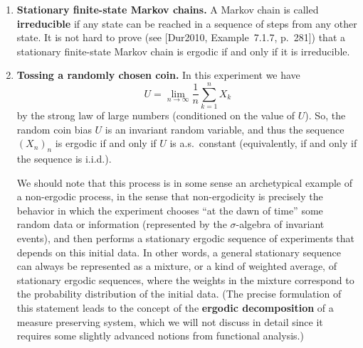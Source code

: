 \documentclass[12pt]{article}
\newcommand{\R}{\mathbb{R}}
\newcommand{\N}{\mathbb{N}}
\theoremstyle{example}
\begin{document}
\begin{enumerate}[1.]
\begin{proof}
Let $A$ be an invariant event for the $(Y_n)$ sequence. We can think of $A$ as ``living'' in the original product space $\R^\N$ associated with the shift map for the sequence $(X_n)_n$. (Formally, the sequence $(Y_n)_n$ is an infinite-dimensional random vector, i.e., it maps the $\R^\N$ ``of'' the $(X_n)_n$ sequence into a ``different copy'' of $\R^\N$; by pulling back the event $A$ with respect to this mapping we get a ``copy'' of $A$ in the original product space.) The fact that $A$ is invariant under shifting the $Y_n$'s means it is also invariant under the original shift of the $X_n$'s, hence is a 0-1 event by the assumption that the $(X_n)_n$ sequence is ergodic.
\end{proof}



\item \textbf{Stationary finite-state Markov chains.} A Markov chain is called \textbf{irreducible} if any state can be reached in a sequence of steps from any other state. It is not hard to prove (see [Dur2010, Example~7.1.7, p.~281]) that a stationary finite-state Markov chain is ergodic if and only if it is irreducible.

\item \textbf{Tossing a randomly chosen coin.} In this experiment we have
$$ U = \lim_{n\to\infty} \frac{1}{n}\sum_{k=1}^n X_k $$
by the strong law of large numbers (conditioned on the value of $U$). So, the random coin bias $U$ is an invariant random variable, and thus the sequence $(X_n)_n$ is ergodic if and only if $U$ is a.s.\ constant (equivalently, if and only if the sequence is i.i.d.).

We should note that this process is in some sense an archetypical example of a non-ergodic process, in the sense that non-ergodicity is precisely the behavior in which the experiment chooses ``at the dawn of time'' some random data or information (represented by the $\sigma$-algebra of invariant events), and then performs a stationary ergodic sequence of experiments that depends on this initial data. In other words, a general stationary sequence can always be represented as a mixture, or a kind of weighted average, of stationary ergodic sequences, where the weights in the mixture correspond to the probability distribution of the initial data. (The precise formulation of this statement leads to the concept of the \textbf{ergodic decomposition} of a measure preserving system, which we will not discuss in detail since it requires some slightly advanced notions from functional analysis.)


\end{enumerate}
\end{document}
